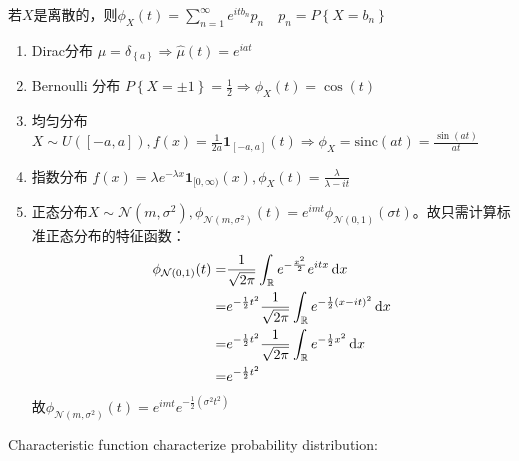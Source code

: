 \documentclass{ctexbook}
\begin{document}
\begin{Eg}
  若$X$是离散的，则$\phi_X(t)=\sum_{n=1}^{\infty}e^{itb_n}p_n \quad p_n=P \left\{ X=b_n \right\}$
  
\begin{enumerate}
\item Dirac分布 $\mu=\delta_{ \left\{ a \right\}}\Rightarrow \hat{\mu}(t)=e^{iat}$
\item Bernoulli 分布 $P \left\{ X=\pm 1 \right\}= \frac{1}{2}\Rightarrow\phi_X(t)=\cos(t)$
\item 均匀分布 $X\sim U([-a,a]), f(x)=\frac{1}{2a} \mathbf{1}_{\left[ -a,a \right]}(t)\Rightarrow \phi_X=\mathrm{sinc}(at)=\frac{\sin(at)}{at}$
\item 指数分布 $f(x)=\lambda e^{-\lambda x}\mathbf{1}_{[0,\infty)}(x), \phi_X(t)=\frac{\lambda}{\lambda-it}$
\item 正态分布$X\sim \mathcal{N}(m,\sigma^2), \phi_{\mathcal{N}(m,\sigma^2)}(t)=e^{imt}\phi_{\mathcal{N}(0,1)}(\sigma t)$。故只需计算标准正态分布的特征函数： 
\begin{align}
  \phi_{\mathcal{N}(0,1)}(t)=&\frac{1}{\sqrt{2\pi}}\int_{\mathbb{R}}e^{-\frac{x^2}{2}}e^{itx}\,\mathrm{d} x\\
  =&e^{-\frac{1}{2}t^2}\frac{1}{\sqrt{2\pi}}\int_{\mathbb{R}}e^{-\frac{1}{2}(x-it)^2}\,\mathrm{d} x\\
  =&e^{-\frac{1}{2}t^2}\frac{1}{\sqrt{2\pi}}\int_{\mathbb{R}}e^{-\frac{1}{2}x^2}\,\mathrm{d} x\\
  =&e^{-\frac{1}{2}t^2}
\end{align}
故$\phi_{\mathcal{N}(m,\sigma^2)}(t)=e^{imt}e^{-\frac{1}{2}(\sigma^2 t^2)}$
\end{enumerate}
\end{Eg}

Characteristic function characterize probability distribution:
\end{document}
